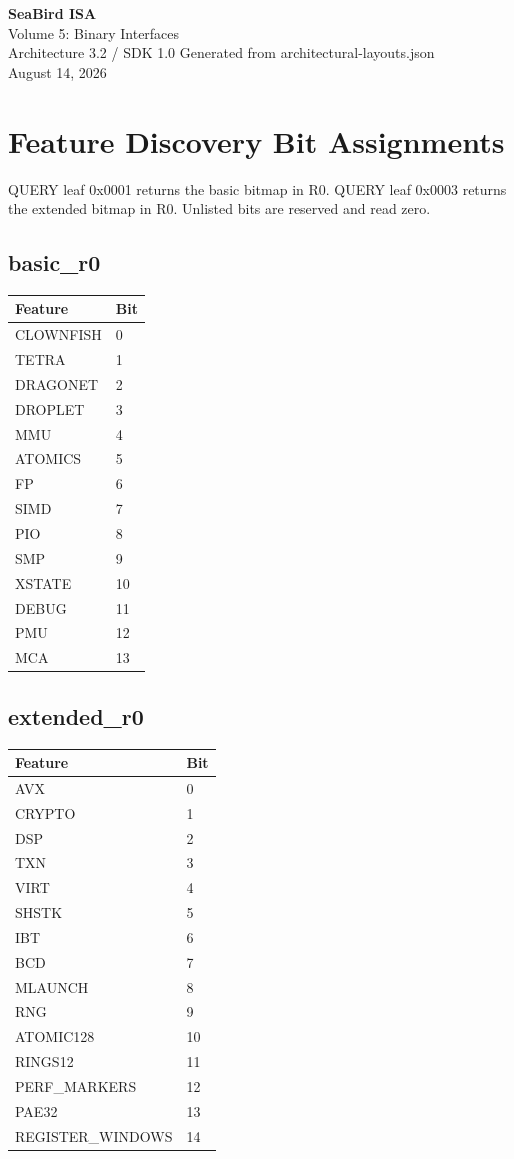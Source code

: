 \documentclass[10pt]{article}
\begin{document}
\begin{titlepage}\centering\vspace*{2cm}
{\Huge\bfseries SeaBird ISA\\[0.3cm]}{\LARGE Volume 5: Binary Interfaces\\[0.5cm]}
{\Large Architecture 3.2 / SDK 1.0}\vfill
{\large Generated from architectural-layouts.json\\August 14, 2026}\vfill
\end{titlepage}
\tableofcontents\clearpage
\section{Feature Discovery Bit Assignments}
QUERY leaf 0x0001 returns the basic bitmap in R0. QUERY leaf 0x0003 returns the extended bitmap in R0. Unlisted bits are reserved and read zero.

\subsection{basic\_\allowbreak{}r0}
\begin{longtable}{@{}L{3.5cm}L{2cm}@{}}
\toprule Feature & Bit \\ \midrule
CLOWNFISH & 0 \\
TETRA & 1 \\
DRAGONET & 2 \\
DROPLET & 3 \\
MMU & 4 \\
ATOMICS & 5 \\
FP & 6 \\
SIMD & 7 \\
PIO & 8 \\
SMP & 9 \\
XSTATE & 10 \\
DEBUG & 11 \\
PMU & 12 \\
MCA & 13 \\
\bottomrule\end{longtable}
\subsection{extended\_\allowbreak{}r0}
\begin{longtable}{@{}L{3.5cm}L{2cm}@{}}
\toprule Feature & Bit \\ \midrule
AVX & 0 \\
CRYPTO & 1 \\
DSP & 2 \\
TXN & 3 \\
VIRT & 4 \\
SHSTK & 5 \\
IBT & 6 \\
BCD & 7 \\
MLAUNCH & 8 \\
RNG & 9 \\
ATOMIC128 & 10 \\
RINGS12 & 11 \\
PERF\_\allowbreak{}MARKERS & 12 \\
PAE32 & 13 \\
REGISTER\_\allowbreak{}WINDOWS & 14 \\
\bottomrule\end{longtable}
\end{document}
